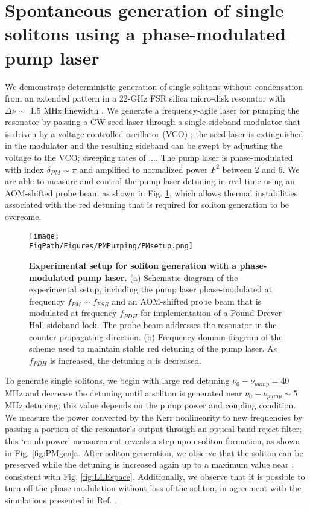 \section{Spontaneous generation of single solitons using a phase-modulated pump laser}


We demonstrate deterministic generation of single solitons without condensation from an extended pattern in a 22-GHz FSR silica micro-disk resonator with $\Delta\nu\sim$ 1.5 MHz linewidth \cite{Lee2012}. We generate a frequency-agile laser for pumping the resonator by passing a CW seed laser through a single-sideband modulator that is driven by a voltage-controlled oscillator (VCO) \cite{Stone2017}; the seed laser is extinguished in the modulator and the resulting sideband can be swept by adjusting the voltage to the VCO; sweeping rates of .... The pump laser is phase-modulated with index $\delta_{PM}\sim\pi$ and amplified to normalized power $F^2$ between 2 and 6. We are able to measure and control the pump-laser detuning in real time using an AOM-shifted probe beam as shown in Fig. \ref{fig:PMsetup}, which allows thermal instabilities associated with the red detuning that is required for soliton generation to be overcome. 

\begin{figure}[htpb]
	\begin{center}
		\texttt{[image: \\FigPath/Figures/PMPumping/PMsetup.png]}
	\end{center}
	\caption[Experimental setup for soliton generation with a phase-modulated pump laser]{\textbf{Experimental setup for soliton generation with a phase-modulated pump laser.} (a) Schematic diagram of the experimental setup, including the pump laser phase-modulated at frequency $f_{PM}\sim f_{FSR}$ and an AOM-shifted probe beam that is modulated at frequency $f_{PDH}$ for implementation of a Pound-Drever-Hall sideband lock. The probe beam addresses the resonator in the counter-propagating direction. (b) Frequency-domain diagram of the scheme used to maintain stable red detuning of the pump laser. As $f_{PDH}$ is increased, the detuning $\alpha$ is decreased.}
	\label{fig:PMsetup}
\end{figure} 


To generate single solitons, we begin with large red detuning $\nu_0-\nu_{pump}=$40 MHz and decrease the detuning until a soliton is generated near $\nu_0-\nu_{pump}\sim$5 MHz detuning; this value depends on the pump power and coupling condition. We measure the power converted by the Kerr nonlinearity to new frequencies by passing a portion of the resonator's output through an optical band-reject filter; this `comb power' measurement reveals a step upon soliton formation, as shown in Fig. \ref{fig:PMgen}a. After soliton generation, we observe that the soliton can be preserved while the detuning is increased again up to a maximum value near , consistent with Fig. \ref{fig:LLEspace}. Additionally, we observe that it is possible to turn off the phase modulation without loss of the soliton, in agreement with the simulations presented in Ref. \cite{Taheri2015}.

